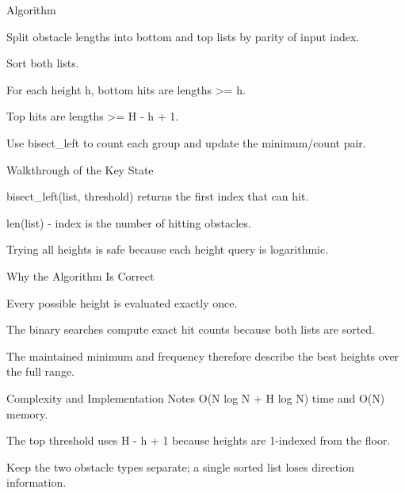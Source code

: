 \documentclass[aspectratio=169,11pt]{beamer}
\begin{document}
\begin{frame}{Algorithm}
\begin{tightitemize}
  \item Split obstacle lengths into bottom and top lists by parity of input index.
  \item Sort both lists.
  \item For each height h, bottom hits are lengths >= h.
  \item Top hits are lengths >= H - h + 1.
  \item Use bisect\_left to count each group and update the minimum/count pair.
\end{tightitemize}
\end{frame}

\begin{frame}{Walkthrough of the Key State}
\begin{tightitemize}
  \item bisect\_left(list, threshold) returns the first index that can hit.
  \item len(list) - index is the number of hitting obstacles.
  \item Trying all heights is safe because each height query is logarithmic.
\end{tightitemize}
\end{frame}

\begin{frame}{Why the Algorithm Is Correct}
\begin{tightitemize}
  \item Every possible height is evaluated exactly once.
  \item The binary searches compute exact hit counts because both lists are sorted.
  \item The maintained minimum and frequency therefore describe the best heights over the full range.
\end{tightitemize}
\end{frame}

\begin{frame}{Complexity and Implementation Notes}
\small
{} O(N log N + H log N) time and O(N) memory.

\vspace{0.3cm}
\begin{tightitemize}
  \item The top threshold uses H - h + 1 because heights are 1-indexed from the floor.
  \item Keep the two obstacle types separate; a single sorted list loses direction information.
\end{tightitemize}
\end{frame}
\end{document}
